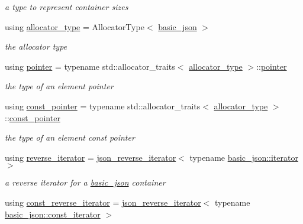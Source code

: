 \begin{DoxyCompactItemize}
\begin{DoxyCompactList}\small\item\em a type to represent container sizes \end{DoxyCompactList}\item 
using \hyperlink{a00025_aa44ce84b9ac506b905b8fb56c9a0989d}{allocator\+\_\+type} = Allocator\+Type$<$ \hyperlink{a00025}{basic\+\_\+json} $>$\hypertarget{a00025_aa44ce84b9ac506b905b8fb56c9a0989d}{}\label{a00025_aa44ce84b9ac506b905b8fb56c9a0989d}

\begin{DoxyCompactList}\small\item\em the allocator type \end{DoxyCompactList}\item 
using \hyperlink{a00025_a9d1b58099dc64695fcf2847ab0b2a7c7}{pointer} = typename std\+::allocator\+\_\+traits$<$ \hyperlink{a00025_aa44ce84b9ac506b905b8fb56c9a0989d}{allocator\+\_\+type} $>$\+::\hyperlink{a00025_a9d1b58099dc64695fcf2847ab0b2a7c7}{pointer}\hypertarget{a00025_a9d1b58099dc64695fcf2847ab0b2a7c7}{}\label{a00025_a9d1b58099dc64695fcf2847ab0b2a7c7}

\begin{DoxyCompactList}\small\item\em the type of an element pointer \end{DoxyCompactList}\item 
using \hyperlink{a00025_a06efb200b69942eacd1ea22d0f6ccebb}{const\+\_\+pointer} = typename std\+::allocator\+\_\+traits$<$ \hyperlink{a00025_aa44ce84b9ac506b905b8fb56c9a0989d}{allocator\+\_\+type} $>$\+::\hyperlink{a00025_a06efb200b69942eacd1ea22d0f6ccebb}{const\+\_\+pointer}\hypertarget{a00025_a06efb200b69942eacd1ea22d0f6ccebb}{}\label{a00025_a06efb200b69942eacd1ea22d0f6ccebb}

\begin{DoxyCompactList}\small\item\em the type of an element const pointer \end{DoxyCompactList}\item 
using \hyperlink{a00025_a2f1f83aa187a56dc5ec7a7027065ac8a}{reverse\+\_\+iterator} = \hyperlink{a00080}{json\+\_\+reverse\+\_\+iterator}$<$ typename \hyperlink{a00079}{basic\+\_\+json\+::iterator} $>$\hypertarget{a00025_a2f1f83aa187a56dc5ec7a7027065ac8a}{}\label{a00025_a2f1f83aa187a56dc5ec7a7027065ac8a}

\begin{DoxyCompactList}\small\item\em a reverse iterator for a \hyperlink{a00025}{basic\+\_\+json} container \end{DoxyCompactList}\item 
using \hyperlink{a00025_ae336fff01f4b78e3e16e5008dc8dbc00}{const\+\_\+reverse\+\_\+iterator} = \hyperlink{a00080}{json\+\_\+reverse\+\_\+iterator}$<$ typename \hyperlink{a00038}{basic\+\_\+json\+::const\+\_\+iterator} $>$\hypertarget{a00025_ae336fff01f4b78e3e16e5008dc8dbc00}{}\label{a00025_ae336fff01f4b78e3e16e5008dc8dbc00}


\end{DoxyCompactItemize}
